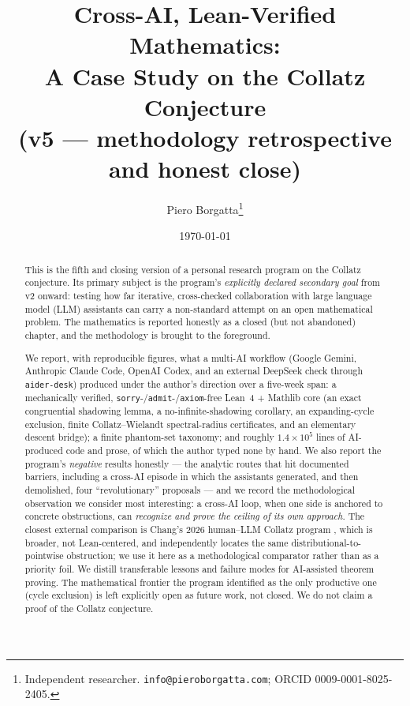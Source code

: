 \documentclass[11pt,a4paper]{article}
\title{
  Cross-AI, Lean-Verified Mathematics: \\
  A Case Study on the Collatz Conjecture \\
  \large (v5 --- methodology retrospective and honest close)
}
\author{Piero Borgatta\thanks{Independent researcher.
\texttt{info@pieroborgatta.com}; ORCID 0009-0001-8025-2405.}}
\date{\today}
\theoremstyle{definition}
\begin{document}
\maketitle

\begin{abstract}
This is the fifth and closing version of a personal research program on the
Collatz conjecture. Its primary subject is the program's \emph{explicitly
declared secondary goal} from v2 onward: testing how far iterative,
cross-checked collaboration with large language model (LLM) assistants can
carry a non-standard attempt on an open mathematical problem. The
mathematics is reported honestly as a closed (but not abandoned) chapter,
and the methodology is brought to the foreground.

We report, with reproducible figures, what a multi-AI workflow (Google
Gemini, Anthropic Claude Code, OpenAI Codex, and an external DeepSeek check
through \texttt{aider-desk}) produced under the author's direction over a
five-week span: a mechanically verified,
\texttt{sorry}-/\texttt{admit}-/\texttt{axiom}-free Lean~4 + Mathlib core
(an exact congruential shadowing lemma, a no-infinite-shadowing corollary,
an expanding-cycle exclusion, finite Collatz--Wielandt spectral-radius
certificates, and an elementary descent bridge); a finite phantom-set
taxonomy; and roughly $1.4\times 10^{5}$ lines of AI-produced code and
prose, of which the author typed none by hand. We also report the
program's \emph{negative} results honestly --- the analytic routes that hit
documented barriers, including a cross-AI episode in which the assistants
generated, and then demolished, four ``revolutionary'' proposals --- and
we record the methodological observation we consider most interesting: a
cross-AI loop, when one side is anchored to concrete obstructions, can
\emph{recognize and prove the ceiling of its own approach}. The closest
external comparison is Chang's 2026 human--LLM Collatz program
\cite{chang2026}, which is broader, not Lean-centered, and independently
locates the same distributional-to-pointwise obstruction; we use it here as
a methodological comparator rather than as a priority foil. We distill
transferable lessons and failure modes for AI-assisted theorem proving. The
mathematical frontier the program identified as the only productive one
(cycle exclusion) is left explicitly open as future work, not closed. We do
not claim a proof of the Collatz conjecture.
\end{abstract}

\tableofcontents
\end{document}
